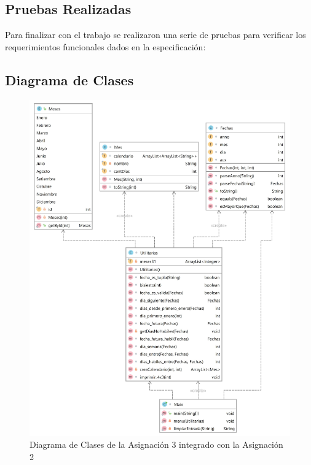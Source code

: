 \documentclass[10pt,journal,compsoc]{IEEEtran}
\begin{document}
\subsection{Pruebas Realizadas}
	\par Para finalizar con el trabajo se realizaron una serie de pruebas para verificar los requerimientos funcionales dados en la especificación:
	
\subsection{Diagrama de Clases}
\begin{figure}[H]
	\centering
	\includegraphics[width=\linewidth]{diagramaClases.png}
	\caption{Diagrama de Clases de la Asignación 3 integrado con la Asignación 2}
\end{figure}
	
\end{document}
